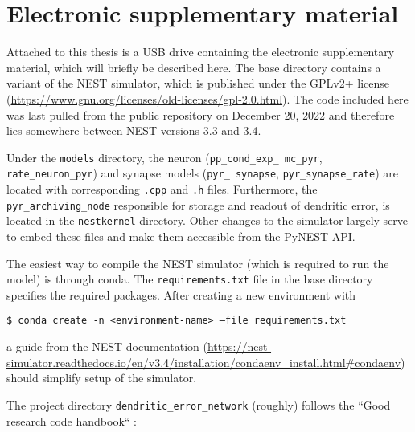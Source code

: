 \newpage
\section{Electronic supplementary material}\label{sec-suppl}

Attached to this thesis is a USB drive containing the electronic supplementary material, which will briefly be
described here. The base directory contains a variant of the NEST simulator, which is published under the
GPLv2+ license (\url{https://www.gnu.org/licenses/old-licenses/gpl-2.0.html}). The code included here was last pulled
from the public repository on December 20, 2022 and therefore lies somewhere between NEST versions 3.3 and 3.4. 

Under the \texttt{models} directory, the neuron (\texttt{pp\_\allowbreak cond\_\allowbreak exp\_\allowbreak
mc\_\allowbreak pyr}, \texttt{rate\_\allowbreak neuron\_\allowbreak pyr}) and synapse models (\texttt{pyr\_\allowbreak
synapse}, \texttt{pyr\_\allowbreak synapse\_\allowbreak rate}) are located with corresponding \texttt{.cpp} and
\texttt{.h} files. Furthermore, the \texttt{pyr\_\allowbreak archiving\_\allowbreak node} responsible for storage and
readout of dendritic error, is located in the \texttt{nestkernel} directory. Other changes to the simulator largely
serve to embed these files and make them accessible from the PyNEST API.

The easiest way to compile the NEST simulator (which is required to run the model) is through conda. The
\texttt{requirements.txt} file in the base directory specifies the required packages. After creating a new environment
with\newline

\texttt{\$ conda create -n <environment-name> --file requirements.txt}\newline

a guide from the NEST
  documentation (\url{https://nest-simulator.readthedocs.io/en/v3.4/installation/condaenv_install.html#condaenv}) should simplify setup of the simulator.

The project directory \texttt{dendritic\_\allowbreak error\_\allowbreak network} (roughly) follows the ``Good research
code handbook`` \citep{Mineault2021}:

